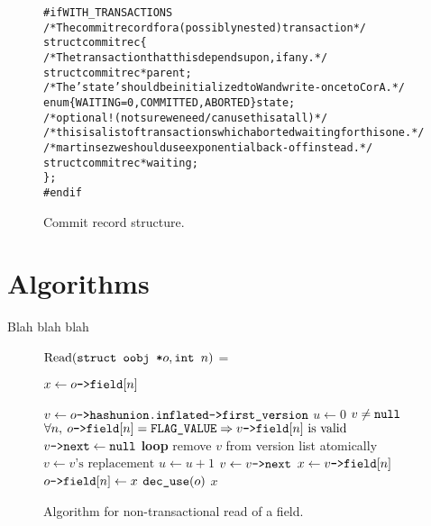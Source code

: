 \documentclass[11pt,notitlepage]{article}
\newcommand{\ptr}{\code{->}}
\newcommand{\codesize}{\scriptsize}
\begin{document}
\begin{figure}
\begin{alltt}\codesize
#if WITH_TRANSACTIONS
/* The commit record for a (possibly nested) transaction */
struct commitrec \{
  /* The transaction that this depends upon, if any. */
  struct commitrec *parent;
  /* The 'state' should be initialized to W and write-once to C or A. */
  enum \{ WAITING=0, COMMITTED, ABORTED \} state;
  /* optional! (not sure we need/can use this at all) */
  /* this is a list of transactions which aborted waiting for this one. */
  /* martin sez we should use exponential back-off instead. */
  struct commitrec *waiting;
\};
#endif
\end{alltt}
\caption{Commit record structure.}
\label{fig:commitrec}
\end{figure}

\section{Algorithms}

Blah blah blah

\begin{figure}
$\text{Read}(\texttt{struct oobj *} o, \texttt{int } n)$ =
\begin{myalgorithmic}
\STATE $x \gets o\ptr \code{field}[n]$

\STATE $v \gets o \ptr \code{hashunion.inflated} \ptr \code{first\_version}$
\STATE $u \gets 0$ 
\LOOP
  \ASSERT $v \neq \texttt{null}$
  \MATCHING{$\text{StateP}(v \ptr \code{transid})$}
    \ASSERT \small$\forall n,\: o \ptr \code{field}[n]=\code{FLAG\_VALUE}
             \Rightarrow  v \ptr \code{field}[n] \text{ is valid }$
    \STATE {}
    \STATE $v\ptr\code{next} \gets \code{null}$
    \BREAK \textbf{loop}
   \ENDCASE
    \STATE {}
    \STATE remove $v$ from version list atomically
    \STATE $v \gets v\text{'s replacement}$
   \ENDCASE
   \CASEDEFAULT
    \STATE $u \gets u + 1$
    \STATE $v \gets v \ptr \code{next}$
   \ENDCASE
  \ENDMATCHING
\ENDLOOP*
\STATE $x \gets v \ptr \code{field}[n]$
  \STATE {}
  \STATE $o \ptr \code{field}[n] \gets x$ 
  \STATE $\texttt{dec\_use}(o)$
\ENDIF
\ENDIF
\RETURN $x$
\end{myalgorithmic}
\caption{Algorithm for non-transactional read of a field.}
\label{fig:readnotrans}
\end{figure}
\end{document}
